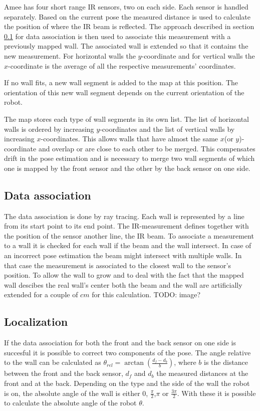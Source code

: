 Amee has four short range IR sensors, two on each side. Each sensor is handled separately. Based on the current pose the measured distance is used to calculate the position of where the IR beam is reflected. The approach described in section \ref{subsec:dataAssoc} for data association is then used to associate this measurement with a previously mapped wall. The associated wall is extended so that it contains the new measurement. For horizontal walls the $y$-coordinate and for vertical walls the $x$-coordinate is the average of all the respective measurements' coordinates. 

If no wall fits, a new wall segment is added to the map at this position. The orientation of this new wall segment depends on the current orientation of the robot.

The map stores each type of wall segments in its own list. The list of horizontal walls is ordered by increasing $y$-coordinates and the list of vertical walls by increasing $x$-coordinates. This allows walls that have almost the same $x$(or $y$)-coordinate and overlap or are close to each other to be merged. This compensates drift in the pose estimation and is necessary to merge two wall segments of which one is mapped by the front sensor and the other by the back sensor on one side. 

\subsection{Data association}
\label{subsec:dataAssoc}
The data association is done by ray tracing. Each wall is represented by a line from its start point to its end point. The IR-measurement defines together with the position of the sensor another line, the IR beam. To associate a measurement to a wall it is checked for each wall if the beam and the wall intersect. In case of an incorrect pose estimation the beam might intersect with multiple walls. In that case the measurement is associated to the closest wall to the sensor's position. To allow the wall to grow and to deal with the fact that the mapped wall descibes the real wall's center both the beam and the wall are artificially extended for a couple of $cm$ for this calculation. TODO: image?    

\subsection{Localization}
\label{subsec:Localization}
If the data association for both the front and the back sensor on one side is succesful it is possible to correct two components of the pose. The angle relative to the wall can be calculated as $\theta_{rel} = \arctan(\frac{d_{f} - d_{b}}{b})$, where $b$ is the distance between the front and the back sensor, $d_f$ and $d_b$ the measured distances at the front and at the back. Depending on the type and the side of the wall the robot is on, the absolute angle of the wall is either $0$, $\frac{\pi}{2}$,$\pi$ or $\frac{3 \pi}{2}$. With these it is possible to calculate the absolute angle of the robot $\theta$.

